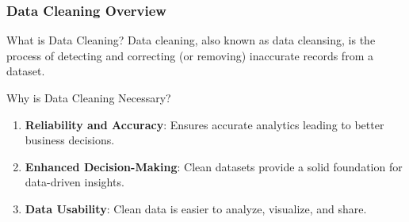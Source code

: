 \documentclass[aspectratio=169]{beamer}
\begin{document}
\begin{frame}[fragile]
    \frametitle{Data Cleaning Overview}
    
    \begin{block}{What is Data Cleaning?}
        Data cleaning, also known as data cleansing, is the process of detecting and correcting (or removing) inaccurate records from a dataset.
    \end{block}
    
    \begin{block}{Why is Data Cleaning Necessary?}
        \begin{enumerate}
            \item \textbf{Reliability and Accuracy}: Ensures accurate analytics leading to better business decisions.
            \item \textbf{Enhanced Decision-Making}: Clean datasets provide a solid foundation for data-driven insights.
            \item \textbf{Data Usability}: Clean data is easier to analyze, visualize, and share.
        \end{enumerate}
    \end{block}
\end{frame}
\end{document}
